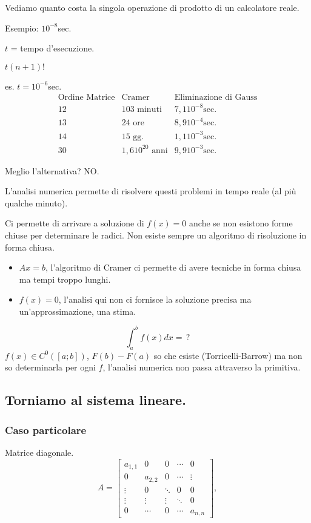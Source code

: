 Vediamo quanto costa la singola operazione di prodotto di un calcolatore
reale.

Esempio: $10^{-8}$sec.

$t$ = tempo d'esecuzione.

$t(n+1)!$

es. $t = 10^{-6}$sec.
\begin{displaymath}
\begin{array}{c|c|c}
\textrm{Ordine Matrice} & \textrm{Cramer} & \textrm{Eliminazione di Gauss} \\
\hline
12 & 103 \textrm{ minuti} & 7,1 10^{-8} \textrm{sec.} \\
13 & 24 \textrm{ ore} & 8,9 10^{-4} \textrm{sec.} \\
14 & 15 \textrm{ gg.} & 1,1 10^{-3} \textrm{sec.} \\
30 & 1,6 10^{20}\textrm{ anni} & 9,9 10^{-3} \textrm{sec.}
\end{array}
\end{displaymath}

Meglio l'alternativa? NO.

L'analisi numerica permette di risolvere questi problemi in tempo reale
(al più qualche minuto).

Ci permette di  arrivare a soluzione di $f(x) = 0$ anche se non esistono
forme chiuse per determinare le radici. Non esiste sempre un algoritmo di
risoluzione in forma chiusa.
\begin{itemize}
\item $Ax = b$, l'algoritmo di Cramer ci permette di avere tecniche in forma
chiusa ma
tempi troppo lunghi.
\item $f(x) = 0$, l'analisi qui non ci fornisce la soluzione precisa ma
un'approssimazione, una stima.
\end{itemize}
\[
\int_a^bf(x)dx = \,?
\]
$f(x) \in C^0([a;b])$, $
F(b) - F(a)$ so che esiste (Torricelli-Barrow) ma non so determinarla per ogni
$f$,
l'analisi numerica non passa attraverso la primitiva.

\subsection*{Torniamo al sistema lineare.}

\subsubsection*{Caso particolare}
Matrice diagonale.
\[
A = \left[ \begin{array}{ccccc}
a_{1,1} & 0 & 0 & \cdots & 0 \\
0 & a_{2,2}& 0 & \cdots & \vdots \\
\vdots & 0 & \ddots & 0 & 0 \\
\vdots & \vdots & \vdots & \ddots & 0 \\
0 & \cdots & 0 & \cdots & a_{n,n}
\end{array} \right],
\]


